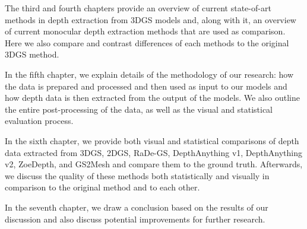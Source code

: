 The third and fourth chapters provide an overview of current state-of-art methods in depth extraction from 3DGS models and, along with it, an overview of current monocular depth extraction methods that are used as comparison. Here we also compare and contrast differences of each methods to the original 3DGS method.

In the fifth chapter, we explain details of the methodology of our research: how the data is prepared and processed and then used as input to our models and how depth data is then extracted from the output of the models. We also outline the entire post-processing of the data, as well as the visual and statistical evaluation process.

In the sixth chapter, we provide both visual and statistical comparisons of depth data extracted from 3DGS, 2DGS, RaDe-GS, DepthAnything v1, DepthAnything v2, ZoeDepth, and GS2Mesh and compare them to the ground truth. Afterwards, we discuss the quality of these methods both statistically and visually in comparison to the original method and to each other.

In the seventh chapter, we draw a conclusion based on the results of our discussion and also discuss potential improvements for further research.